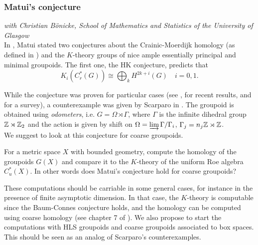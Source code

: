 \subsubsection*{Matui's conjecture}

\textit{with Christian B\"onicke, School of Mathematics and Statistics of the University of Glasgow}\\ 

In \cite{matui2016etale}, Matui stated two conjectures about the Crainic-Moerdijk homology (as defined in \cite{crainic2000homology}) and the $K$-theory groups of nice ample essentially principal and minimal groupoids. The first one, the HK conjecture, predicts that 
\[K_i (C_r^*(G)) \cong \bigoplus_k H^{2k+i}(G)\quad i=0,1.\]

While the conjecture was proven for particular cases (see \cite{ortega2018homology}, \cite{farsi2018ample} for recent results, and  \cite{MatuiSurvey} for a survey), a counterexample was given by Scarparo in \cite{scarparo2018homology}. The groupoid is obtained using \textit{odometers}, i.e. $G=\Omega \rtimes \Gamma$, where $\Gamma$ is the infinite dihedral group $\mathbb{Z}\rtimes \mathbb{Z}_2$ and the action is given by shift on $\Omega=\varinjlim \Gamma/ \Gamma_i$, $\Gamma_j = n_j \mathbb{Z} \rtimes \mathbb{Z}$.\\

We suggest to look at this conjecture for coarse groupoids. 

\begin{project}
For a metric space $X$ with bounded geometry, compute the homology of the groupoids $G(X)$ and compare it to the $K$-theory of the uniform Roe algebra $C^*_u(X)$. In other words does Matui's conjecture hold for coarse groupoids?
\end{project}

These computations should be carriable in some general cases, for instance in the presence of finite asymptotic dimension. In that case, the $K$-theory is computable since the Baum-Connes conjecture holds, and the homology can be computed using coarse homology (see chapter 7 of \cite{NowakYu}). We also propose to start the computations with HLS groupoids and coarse groupoids associated to box spaces. This should be seen as an analog of Scarparo's counterexamples.



